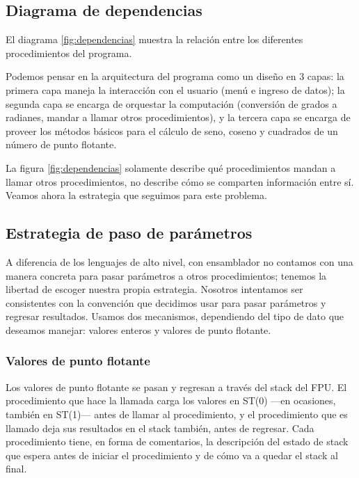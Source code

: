 \documentclass[12pt]{article}
\begin{document}
\subsection{Diagrama de dependencias}

El diagrama \ref{fig:dependencias} muestra la relación entre los diferentes
procedimientos del programa.



Podemos pensar en la arquitectura del programa como un diseño en 3 capas: la
primera capa maneja la interacción con el usuario (menú e ingreso de datos); la
segunda capa se encarga de orquestar la computación (conversión de grados a
radianes, mandar a llamar otros procedimientos), y la tercera capa se encarga
de proveer los métodos básicos para el cálculo de seno, coseno y cuadrados de
un número de punto flotante.

La figura \ref{fig:dependencias} solamente describe qué procedimientos mandan a
llamar otros procedimientos, no describe cómo se comparten información entre
sí. Veamos ahora la estrategia que seguimos para este problema.

\subsection{Estrategia de paso de parámetros}

A diferencia de los lenguajes de alto nivel, con ensamblador no contamos con
una manera concreta para pasar parámetros a otros procedimientos; tenemos la
libertad de escoger nuestra propia estrategia. Nosotros intentamos ser
consistentes con la convención que decidimos usar para pasar parámetros y
regresar resultados. Usamos dos mecanismos, dependiendo del tipo de dato que
deseamos manejar: valores enteros y valores de punto flotante.

\subsubsection{Valores de punto flotante}

Los valores de punto flotante se pasan y regresan a través del stack del FPU.
El procedimiento que hace la llamada carga los valores en ST(0) ---en
ocasiones, también en ST(1)--- antes de llamar al procedimiento, y el
procedimiento que es llamado deja sus resultados en el stack también, antes de
regresar. Cada procedimiento tiene, en forma de comentarios, la descripción del
estado de stack que espera antes de iniciar el procedimiento y de cómo va a
quedar el stack al final.
\end{document}
